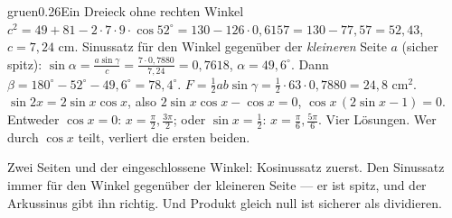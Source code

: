 \begin{loesungkarte}{gruen}{0.26}{Ein Dreieck ohne rechten Winkel}
$c^{2} = 49 + 81 - 2\cdot7\cdot9\cdot\cos52^{\circ} = 130 - 126\cdot0{,}6157 = 130 - 77{,}57 = 52{,}43$, $c = 7{,}24$ cm. Sinussatz für den Winkel gegenüber der \emph{kleineren} Seite $a$ (sicher spitz): $\sin\alpha = \frac{a\sin\gamma}{c} = \frac{7\cdot0{,}7880}{7{,}24} = 0{,}7618$, $\alpha = 49{,}6^{\circ}$. Dann $\beta = 180^{\circ} - 52^{\circ} - 49{,}6^{\circ} = 78{,}4^{\circ}$.
$F = \frac12ab\sin\gamma = \frac12\cdot63\cdot0{,}7880 = 24{,}8$ cm$^{2}$.
$\sin2x = 2\sin x\cos x$, also $2\sin x\cos x - \cos x = 0$, $\cos x\,(2\sin x - 1) = 0$. Entweder $\cos x = 0$: $x = \frac\pi2, \frac{3\pi}2$; oder $\sin x = \frac12$: $x = \frac\pi6, \frac{5\pi}6$. Vier Lösungen. Wer durch $\cos x$ teilt, verliert die ersten beiden.
\begin{mitnehmen}\kastentext
Zwei Seiten und der eingeschlossene Winkel: Kosinussatz zuerst. Den Sinussatz immer für den Winkel gegenüber der kleineren Seite --- er ist spitz, und der Arkussinus gibt ihn richtig. Und Produkt gleich null ist sicherer als dividieren.
\end{mitnehmen}
\end{loesungkarte}

